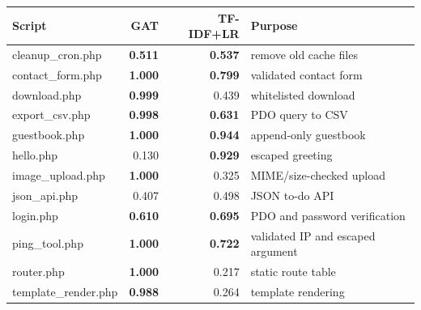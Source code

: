 \begin{tabular}{@{}lrrl@{}}
\toprule
Script & GAT & TF-IDF+LR & Purpose \\ \midrule
cleanup\_cron.php & \textbf{0.511} & \textbf{0.537} & remove old cache files \\
contact\_form.php & \textbf{1.000} & \textbf{0.799} & validated contact form \\
download.php & \textbf{0.999} & 0.439 & whitelisted download \\
export\_csv.php & \textbf{0.998} & \textbf{0.631} & PDO query to CSV \\
guestbook.php & \textbf{1.000} & \textbf{0.944} & append-only guestbook \\
hello.php & 0.130 & \textbf{0.929} & escaped greeting \\
image\_upload.php & \textbf{1.000} & 0.325 & MIME/size-checked upload \\
json\_api.php & 0.407 & 0.498 & JSON to-do API \\
login.php & \textbf{0.610} & \textbf{0.695} & PDO and password verification \\
ping\_tool.php & \textbf{1.000} & \textbf{0.722} & validated IP and escaped argument \\
router.php & \textbf{1.000} & 0.217 & static route table \\
template\_render.php & \textbf{0.988} & 0.264 & template rendering \\
\bottomrule
\end{tabular}
